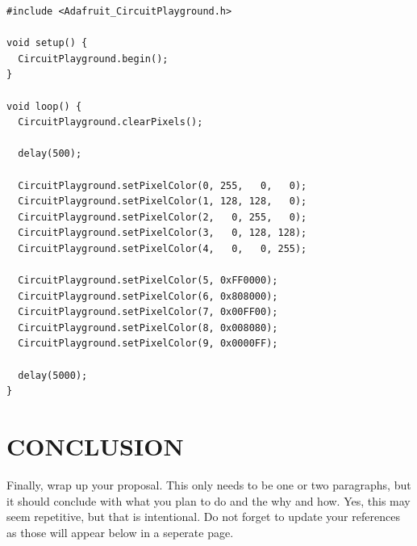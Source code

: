 \documentclass[12pt]{article}
\begin{document}
\begin{lstlisting}[language=Arduino]
#include <Adafruit_CircuitPlayground.h>

void setup() {
  CircuitPlayground.begin();
}

void loop() {
  CircuitPlayground.clearPixels();

  delay(500);

  CircuitPlayground.setPixelColor(0, 255,   0,   0);
  CircuitPlayground.setPixelColor(1, 128, 128,   0);
  CircuitPlayground.setPixelColor(2,   0, 255,   0);
  CircuitPlayground.setPixelColor(3,   0, 128, 128);
  CircuitPlayground.setPixelColor(4,   0,   0, 255);
  
  CircuitPlayground.setPixelColor(5, 0xFF0000);
  CircuitPlayground.setPixelColor(6, 0x808000);
  CircuitPlayground.setPixelColor(7, 0x00FF00);
  CircuitPlayground.setPixelColor(8, 0x008080);
  CircuitPlayground.setPixelColor(9, 0x0000FF);
 
  delay(5000);
}
\end{lstlisting}

\section{CONCLUSION}
Finally, wrap up your proposal. This only needs to be one or two paragraphs, but it should conclude with what you plan to do and the why and how. Yes, this may seem repetitive, but that is intentional. Do not forget to update your references as those will appear below in a seperate page.

\newpage
\printbibliography[heading=subbibintoc]
%
%
\end{document}
